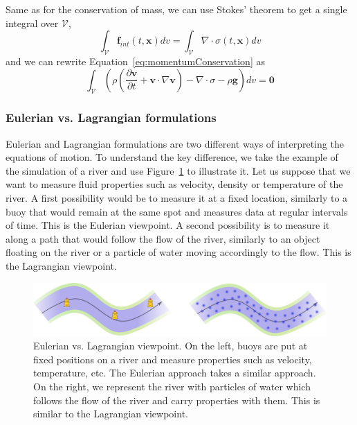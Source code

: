 Same as for the conservation of mass, we can use Stokes' theorem to get a single integral over $\mathcal{V}$,
\begin{equation}
\label{eq:internalForces}
\displaystyle 
\int_{\mathcal{V}} \mathbf{f}_{int}\left(t,\mathbf{x}\right) dv 
=
\int_{\mathcal{V}} \nabla \cdot \sigma\left(t,\mathbf{x}\right) dv
\end{equation}
and we can rewrite Equation~\eqref{eq:momentumConservation} as
\begin{equation}
\label{eq:volumetricMomentumConservation}
\displaystyle
\int_{\mathcal{V}} 
\left( 
\rho \left( \frac{\partial\mathbf{v}}{\partial t} + \mathbf{v} \cdot \nabla \mathbf{v} \right)
- \nabla \cdot \sigma - \rho \mathbf{g}  \right) dv = \mathbf{0}
\end{equation}

\subsubsection{Eulerian vs. Lagrangian formulations}
\label{subsubsec:starMechanics_eulerianLagrangian}
Eulerian and Lagrangian formulations are two different ways of interpreting the equations of motion.
To understand the key difference, we take the example of the simulation of a river and use Figure~\ref{fig:EulerianVsLagrangian} to illustrate it.
Let us suppose that we want to measure fluid properties such as velocity, density or temperature of the river.
A first possibility would be to measure it at a fixed location, similarly to a buoy that would remain at the same spot and measures data at regular intervals of time. This is the Eulerian viewpoint. A second possibility is to measure it along a path that would follow the flow of the river, similarly to an object floating on the river or a particle of water moving accordingly to the flow. This is the Lagrangian viewpoint.
\begin{figure}[!ht]
	\centering
	\includegraphics[width=\linewidth]{images/continuum_mechanics/eulerianVsLagrangian.png}
	\caption[STAR mechanics: Eulerian vs. Lagrangian]{\label{fig:EulerianVsLagrangian} Eulerian vs. Lagrangian viewpoint. On the left, buoys are put at fixed positions on a river and measure properties such as velocity, temperature, etc. The Eulerian approach takes a similar approach. On the right, we represent the river with particles of water which follows the flow of the river and carry properties with them. This is similar to the Lagrangian viewpoint.}
\end{figure}
